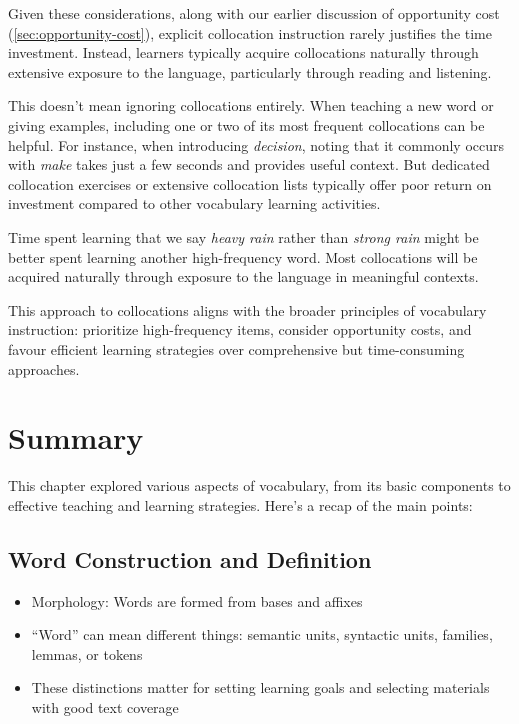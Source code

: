 Given these considerations, along with our earlier discussion of opportunity cost (\ref{sec:opportunity-cost}), explicit collocation instruction rarely justifies the time investment. Instead, learners typically acquire collocations naturally through extensive exposure to the language, particularly through reading and listening.

This doesn't mean ignoring collocations entirely. When teaching a new word or giving examples, including one or two of its most frequent collocations can be helpful. For instance, when introducing \textit{decision}, noting that it commonly occurs with \textit{make} takes just a few seconds and provides useful context. But dedicated collocation exercises or extensive collocation lists typically offer poor return on investment compared to other vocabulary learning activities.

\ea 
\ea Time spent learning that we say \textit{heavy rain} rather than \textit{strong rain} might be better spent learning another high-frequency word.
\ex Most collocations will be acquired naturally through exposure to the language in meaningful contexts.
\z
\z

This approach to collocations aligns with the broader principles of vocabulary instruction: prioritize high-frequency items, consider opportunity costs, and favour efficient learning strategies over comprehensive but time-consuming approaches.

\section{Summary}

This chapter explored various aspects of vocabulary, from its basic components to effective teaching and learning strategies. Here's a recap of the main points:

\subsection*{Word Construction and Definition}

\begin{itemize}
\item Morphology: Words are formed from bases and affixes
\item ``Word'' can mean different things: semantic units, syntactic units, families, lemmas, or tokens
\item These distinctions matter for setting learning goals and selecting materials with good text coverage
\end{itemize}

